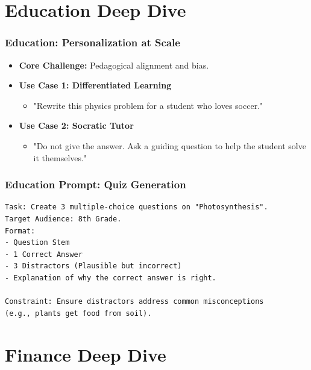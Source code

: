 \documentclass{beamer}
\begin{document}
\section{Education Deep Dive}

\begin{frame}
    \frametitle{Education: Personalization at Scale}
    \begin{itemize}
        \item \textbf{Core Challenge:} Pedagogical alignment and bias.
        \item \textbf{Use Case 1: Differentiated Learning}
        \begin{itemize}
            \item "Rewrite this physics problem for a student who loves soccer."
        \end{itemize}
        \item \textbf{Use Case 2: Socratic Tutor}
        \begin{itemize}
            \item "Do not give the answer. Ask a guiding question to help the student solve it themselves."
        \end{itemize}
    \end{itemize}
\end{frame}

\begin{frame}[fragile]
    \frametitle{Education Prompt: Quiz Generation}
\begin{verbatim}
Task: Create 3 multiple-choice questions on "Photosynthesis".
Target Audience: 8th Grade.
Format:
- Question Stem
- 1 Correct Answer
- 3 Distractors (Plausible but incorrect)
- Explanation of why the correct answer is right.

Constraint: Ensure distractors address common misconceptions 
(e.g., plants get food from soil).
\end{verbatim}
\end{frame}

\section{Finance Deep Dive}
\end{document}
